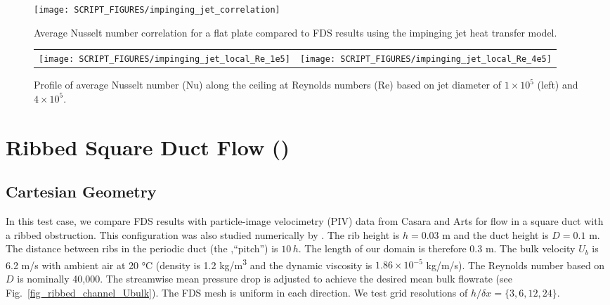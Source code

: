 \documentclass[11pt]{book}
\begin{document}
\begin{figure}[h]
   \centering
   \texttt{[image: SCRIPT\_FIGURES/impinging\_jet\_correlation]}
   \caption[Impinging jet Nusselt correlation]{\label{fig_impinging_jet_corr} Average Nusselt number correlation for a flat plate compared to FDS results using the impinging jet heat transfer model.}
\end{figure}

\begin{figure}[h]
   \centering
   \begin{tabular*}{\textwidth}{lr}
       \texttt{[image: SCRIPT\_FIGURES/impinging\_jet\_local\_Re\_1e5]} &
       \texttt{[image: SCRIPT\_FIGURES/impinging\_jet\_local\_Re\_4e5]} \\
   \end{tabular*}
   \caption[Impinging jet Nusselt profile]{\label{fig_impinging_jet_prof} Profile of average Nusselt number (Nu) along the ceiling at Reynolds numbers (Re) based on jet diameter of $1 \times 10^5$ (left) and $4 \times 10^5$.}
\end{figure}

\clearpage
\section{Ribbed Square Duct Flow (\texorpdfstring{}{ribbed\_channel})}
\label{sec:ribbed_channel}

\subsection{Cartesian Geometry}

In this test case, we compare FDS results with particle-image velocimetry (PIV) data from Casara and Arts \cite{Casara:1,Casara:2} for flow in a square duct with a ribbed obstruction. This configuration was also studied numerically by \cite{Lohasz:1}. The rib height is $h = 0.03$ m and the duct height is $D = 0.1$ m.  The distance between ribs in the periodic duct (the ,``pitch'') is $10 \, h$.  The length of our domain is therefore 0.3 m. The bulk velocity $U_b$ is 6.2 \si{m/s} with ambient air at 20 \si{\degreeCelsius} (density is 1.2 \si{kg/m^3} and the dynamic viscosity is $1.86 \times 10^{-5}$ \si{kg/m/s}). The Reynolds number based on $D$ is nominally 40,000. The streamwise mean pressure drop is adjusted to achieve the desired mean bulk flowrate (see Fig.~\ref{fig_ribbed_channel_Ubulk}).  The FDS mesh is uniform in each direction.  We test grid resolutions of $h/\delta x = \{3,6,12,24\}$.
\end{document}
